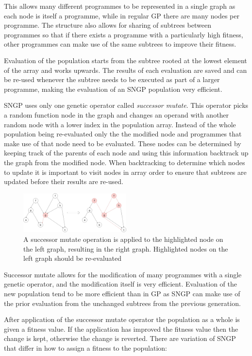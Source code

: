 \documentclass{article}
\begin{document}
	This allows many different programmes to be represented in a single graph as each node is itself a programme, while in regular GP there are many nodes per programme. The structure also allows for sharing of subtrees between programmes so that if there exists a programme with a particularly high fitness, other programmes can make use of the same subtrees to improve their fitness.
	
	Evaluation of the population starts from the subtree rooted at the lowest element of the array and works upwards. The results of each evaluation are saved and can be re-used whenever the subtree needs to be executed as part of a larger programme, making the evaluation of an SNGP population very efficient.
	
	SNGP uses only one genetic operator called \textit{successor mutate}. This operator picks a random function node in the graph and changes an operand with another random node with a lower index in the population array. Instead of the whole population being re-evaluated only the the modified node and programmes that make use of that node need to be evaluated. These nodes can be determined by keeping track of the parents of each node and using this information backtrack up the graph from the modified node. When backtracking to determine which nodes to update it is important to visit nodes in array order to ensure that subtrees are updated before their results are re-used.
	
	\begin{figure}[h]
		\centering
		\includegraphics[width=0.5\textwidth]{10_successor_mutate}
		\caption{A successor mutate operation is applied to the highlighted node on the left graph, resulting in the right graph. Highlighted nodes on the left graph should be re-evaluated}
		\label{fig:successor_mut}
	\end{figure}
	
	Successor mutate allows for the modification of many programmes with a single genetic operator, and the modification itself is very efficient. Evaluation of the new population tend to be more efficient than in GP as SNGP can make use of the prior evaluation from the unchanged subtrees from the previous generation.
	
	After application of the successor mutate operator the population as a whole is given a fitness value. If the application has improved the fitness value then the change is kept, otherwise the change is reverted. There are variation of SNGP that differ in how to assign a fitness to the population:
	
\end{document}
